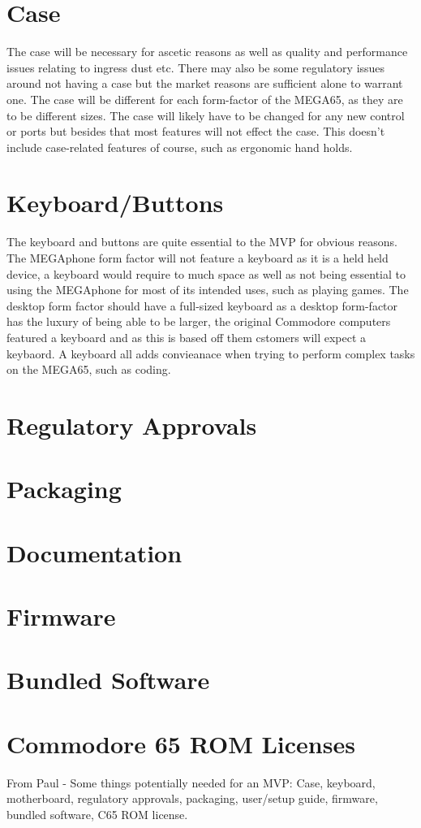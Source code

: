 \section{Case}
The case will be necessary for ascetic reasons as well as quality and performance issues relating to ingress dust etc. There may also be some regulatory issues around not having a case but the market reasons are sufficient alone to warrant one. The case will be different for each form-factor of the MEGA65, as they are to be different sizes. The case will likely have to be changed for any new control or ports but besides that most features will not effect the case. This doesn't include case-related features of course, such as ergonomic hand holds.

\section{Keyboard/Buttons}
The keyboard and buttons are quite essential to the MVP for obvious reasons. The MEGAphone form factor will not feature a keyboard as it is a held held device, a keyboard would require to much space as well as not being essential to using the MEGAphone for most of its intended uses, such as playing games. The desktop form factor should have a full-sized keyboard as a desktop form-factor has the luxury of being able to be larger, the original Commodore computers featured a keyboard and as this is based off them cstomers will expect a keybaord. A keyboard all adds convieanace when trying to perform complex tasks on the MEGA65, such as coding.


\section{Regulatory Approvals}

\section{Packaging}

\section{Documentation}

\section{Firmware}

\section{Bundled Software}

\section{Commodore 65 ROM Licenses}


From Paul - 
Some things potentially needed for an MVP: Case, keyboard, motherboard, regulatory approvals, packaging, user/setup guide, firmware, bundled software, C65 ROM license.

